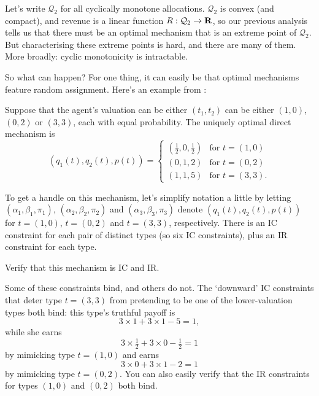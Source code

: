 Let's write $\mathcal{Q}_2$ for all cyclically monotone allocations.
$\mathcal{Q}_2$ is convex (and compact),
and revenue is a linear function $R : \mathcal{Q}_2 \to \mathbf{R}$,
so our previous analysis tells us that there must be an optimal mechanism that is an extreme point of $\mathcal{Q}_2$.
But characterising these extreme points is hard, and there are many of them.
More broadly: cyclic monotonicity is intractable.

So what can happen? For one thing, it can easily be that optimal mechanisms feature random assignment.
Here's an example from \textcite{HartReny2015}:

\begin{proposition}
	\label{proposition:hartreny}
	Suppose that the agent's valuation can be either
	$(t_1,t_2)$ can be either $(1,0)$, $(0,2)$ or $(3,3)$, each with equal probability.
	The uniquely optimal direct mechanism is
	\begin{equation*}
		( q_1(t), q_2(t), p(t) )
		=
		\begin{cases}
			\left( \tfrac{1}{2}, 0, \tfrac{1}{2} \right)
			& \text{for $t=(1,0)$} \\
			( 0, 1, 2 )
			& \text{for $t=(0,2)$} \\
			( 1, 1, 5 )
			& \text{for $t=(3,3)$.} 
		\end{cases}
	\end{equation*}
\end{proposition}

To get a handle on this mechanism, let's simplify notation a little
by letting
$(\alpha_1,\beta_1,\pi_1)$, $(\alpha_2,\beta_2,\pi_2)$ and $(\alpha_3,\beta_3,\pi_3)$ denote $( q_1(t), q_2(t), p(t) )$
for $t = (1,0)$, $t=(0,2)$ and $t=(3,3)$, respectively.
There is an IC constraint for each pair of distinct types (so six IC constraints), plus an IR constraint for each type.

\begin{exercise}
	\label{exercise:hartreny_ic}
	Verify that this mechanism is IC and IR.
\end{exercise}

Some of these constraints bind, and others do not.
The `downward' IC constraints that deter type $t=(3,3)$ from pretending to be one of the lower-valuation types both bind:
this type's truthful payoff is
%
\begin{equation*}
	3 \times 1 + 3 \times 1 - 5
	= 1 ,
\end{equation*}
%
while she earns
%
\begin{equation*}
	3 \times \tfrac{1}{2} + 3 \times 0 - \tfrac{1}{2}
	= 1
\end{equation*}
%
by mimicking type $t=(1,0)$
and earns
%
\begin{equation*}
	3 \times 0 + 3 \times 1 - 2
	= 1
\end{equation*}
%
by mimicking type $t=(0,2)$.
You can also easily verify that the IR constraints for types $(1,0)$ and $(0,2)$ both bind.


